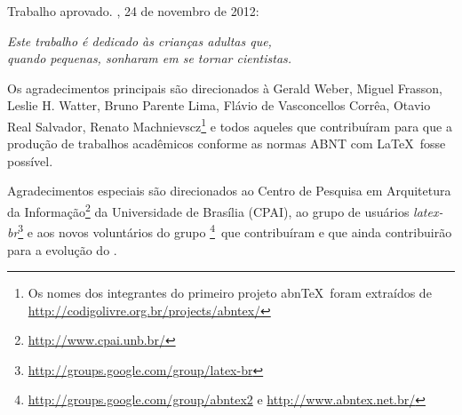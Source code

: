 \documentclass[
	12pt,				%
	openany,			%
	twoside,			%
	a4paper,			%
	chapter=TITLE,		%
	section=Title,		%
	subsection=Title,	%
	subsubsection=Title,%
	english,			%
	french,				%
	spanish,			%
	brazil			%
	]{abntex2}
\begin{document}
\begin{ERRATA}
\begin{folhadeaprovacao}
   Trabalho aprovado. \imprimirlocal, 24 de novembro de 2012:

      
   \begin{center}
    \vspace*{0.5cm}
    {\large\imprimirlocal}
    \par
    {\large\imprimirdata}
    \vspace*{1cm}
  \end{center}
  
\end{folhadeaprovacao}

\begin{dedicatoria}
   \vspace*{\fill}
   \centering
   \noindent
   \textit{ Este trabalho é dedicado às crianças adultas que,\\
   quando pequenas, sonharam em se tornar cientistas.} \vspace*{\fill}
\end{dedicatoria}

\begin{agradecimentos}
Os agradecimentos principais são direcionados à Gerald Weber, Miguel Frasson,
Leslie H. Watter, Bruno Parente Lima, Flávio de Vasconcellos Corrêa, Otavio Real
Salvador, Renato Machnievscz\footnote{Os nomes dos integrantes do primeiro
projeto abn\TeX\ foram extraídos de
\url{http://codigolivre.org.br/projects/abntex/}} e todos aqueles que
contribuíram para que a produção de trabalhos acadêmicos conforme
as normas ABNT com \LaTeX\ fosse possível.

Agradecimentos especiais são direcionados ao Centro de Pesquisa em Arquitetura
da Informação\footnote{\url{http://www.cpai.unb.br/}} da Universidade de
Brasília (CPAI), ao grupo de usuários
\emph{latex-br}\footnote{\url{http://groups.google.com/group/latex-br}} e aos
novos voluntários do grupo
\emph{\abnTeX}\footnote{\url{http://groups.google.com/group/abntex2} e
\url{http://www.abntex.net.br/}}~que contribuíram e que ainda
contribuirão para a evolução do \abnTeX.


\end{agradecimentos}
\end{ERRATA}
\end{document}
